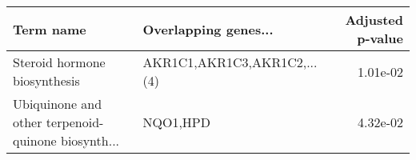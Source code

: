 \begin{tabular}{llr}
\toprule
                                         Term name &        Overlapping genes... &  Adjusted p-value \\
\midrule
                      Steroid hormone biosynthesis & AKR1C1,AKR1C3,AKR1C2,...(4) &          1.01e-02 \\
Ubiquinone and other terpenoid-quinone biosynth... &                    NQO1,HPD &          4.32e-02 \\
\bottomrule
\end{tabular}
